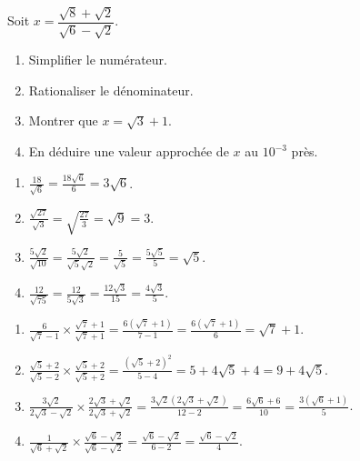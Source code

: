 \documentclass[11pt]{article}
\begin{document}
\begin{exercice}
Soit $x = \dfrac{\sqrt{8}+\sqrt{2}}{\sqrt{6}-\sqrt{2}}$.
\begin{enumerate}
    \item Simplifier le numérateur.
    \item Rationaliser le dénominateur.
    \item Montrer que $x = \sqrt{3}+1$.
    \item En déduire une valeur approchée de $x$ au $10^{-3}$ près.
\end{enumerate}
\end{exercice}

\begin{corrige}[Exercice n°1]
\begin{enumerate}
    \item $\frac{18}{\sqrt{6}} = \frac{18\sqrt{6}}{6} = 3\sqrt{6}$.
    \item $\frac{\sqrt{27}}{\sqrt{3}} = \sqrt{\frac{27}{3}} = \sqrt{9} = 3$.
    \item $\frac{5\sqrt{2}}{\sqrt{10}} = \frac{5\sqrt{2}}{\sqrt{5}\sqrt{2}} = \frac{5}{\sqrt{5}} = \frac{5\sqrt{5}}{5} = \sqrt{5}$.
    \item $\frac{12}{\sqrt{75}} = \frac{12}{5\sqrt{3}} = \frac{12\sqrt{3}}{15} = \frac{4\sqrt{3}}{5}$.
\end{enumerate}
\end{corrige}

\begin{corrige}[Exercice n°2]
\begin{enumerate}
    \item $\frac{6}{\sqrt{7}-1} \times \frac{\sqrt{7}+1}{\sqrt{7}+1} = \frac{6(\sqrt{7}+1)}{7-1} = \frac{6(\sqrt{7}+1)}{6} = \sqrt{7}+1$.
    \item $\frac{\sqrt{5}+2}{\sqrt{5}-2} \times \frac{\sqrt{5}+2}{\sqrt{5}+2} = \frac{(\sqrt{5}+2)^2}{5-4} = 5 + 4\sqrt{5} + 4 = 9 + 4\sqrt{5}$.
    \item $\frac{3\sqrt{2}}{2\sqrt{3}-\sqrt{2}} \times \frac{2\sqrt{3}+\sqrt{2}}{2\sqrt{3}+\sqrt{2}} = \frac{3\sqrt{2}(2\sqrt{3}+\sqrt{2})}{12-2} = \frac{6\sqrt{6}+6}{10} = \frac{3(\sqrt{6}+1)}{5}$.
    \item $\frac{1}{\sqrt{6}+\sqrt{2}} \times \frac{\sqrt{6}-\sqrt{2}}{\sqrt{6}-\sqrt{2}} = \frac{\sqrt{6}-\sqrt{2}}{6-2} = \frac{\sqrt{6}-\sqrt{2}}{4}$.
\end{enumerate}
\end{corrige}
\end{document}
